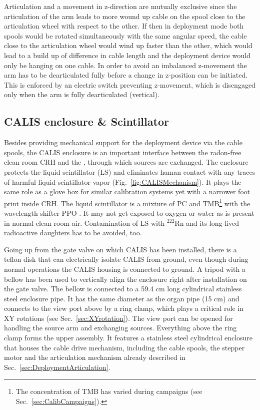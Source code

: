 Articulation and a movement in z-direction are mutually exclusive since the articulation of the arm leads to more wound up cable on the spool close to the articulation wheel with respect to the other. If then in deployment mode both spools would be rotated simultaneously with the same angular speed, the cable close to the articulation wheel would wind up faster than the other, which would lead to a build up of difference in cable length and the deployment device would only be hanging on one cable. In order to avoid an imbalanced z-movement the arm has to be dearticulated fully before a change in z-position can be initiated. This is enforced by an electric switch preventing z-movement, which is disengaged only when the arm is fully dearticulated (vertical). 


\subsection{CALIS enclosure \& Scintillator}

Besides providing mechanical support for the deployment device via the cable spools, the CALIS enclosure is an important interface between the radon-free clean room CRH and the \lsv, through which sources are exchanged. 
The enclosure protects the liquid scintillator (LS) and eliminates human contact with any traces of harmful  liquid scintillator vapor (Fig.~\ref{fig:CALISMechanism}). It plays the same role as a glove box for similar calibration systems yet with a narrower foot print inside CRH. The liquid scintillator is a mixture of PC and TMB\footnote{The concentration of TMB has varied during campaigns (see Sec.~\ref{sec:CalibCampaigns}).} with the wavelength shifter PPO \cite{Agnes:2015qyz}. %
It may not get exposed to oxygen or water as is present in normal clean room air. Contamination of LS with $^{222}$Rn and its long-lived radioactive daughters has to be avoided, too. 

Going up from the gate valve on which CALIS has been installed, there is a teflon disk that can electrically isolate CALIS from ground, even though during normal operations the CALIS housing is connected to ground. A tripod with a bellow has been used to vertically align the enclosure right after installation on the gate valve. The bellow is connected to a 59.4 cm long cylindrical stainless steel enclosure pipe. It has the same diameter as the organ pipe (15 cm) and connects to the view port above by a ring clamp, which plays a critical role in XY rotations (see Sec.~\ref{sec:XYrotation}). The view port can be opened for handling the source arm and exchanging sources. Everything above the ring clamp forms the upper assembly. It features a stainless steel cylindrical enclosure that houses the cable drive mechanism, including the cable spools, the stepper motor and the articulation mechanism already described in Sec.~\ref{sec:DeploymentArticulation}. 

